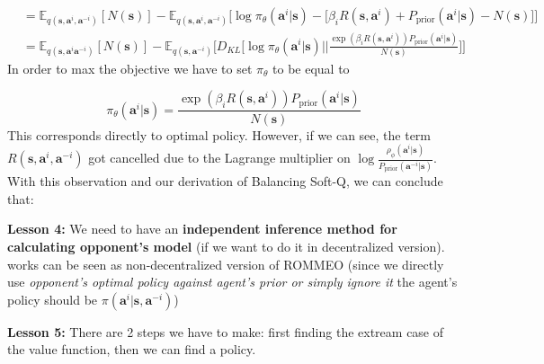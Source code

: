 \begin{equation*}
\begin{aligned}
        &= \mathbb{E}_{q(\boldsymbol{s}, \boldsymbol{a}^i, \boldsymbol{a}^{-i})}[N(\boldsymbol{s})] - 
        \mathbb{E}_{q(\boldsymbol{s}, \boldsymbol{a}^i, \boldsymbol{a}^{-i})}\bigg[\log \pi_{\theta}(\boldsymbol{a}^i | \boldsymbol{s}) - \bigg[\beta_i R(\boldsymbol{s}, \boldsymbol{a}^i) +P_{\text{prior}}(\boldsymbol{a}^i | \boldsymbol{s}) -  N(\boldsymbol{s}) \bigg] \bigg] \\
        &= \mathbb{E}_{q(\boldsymbol{s}, \boldsymbol{a}^i \boldsymbol{a}^{-i})}[N(\boldsymbol{s})] - 
        \mathbb{E}_{q(\boldsymbol{s},  \boldsymbol{a}^{-i})}\bigg[D_{KL}\bigg[ \log \pi_{\theta}(\boldsymbol{a}^i | \boldsymbol{s}) \bigg|\bigg| \frac{\exp\left( \beta_i R(\boldsymbol{s}, \boldsymbol{a}^i)\right) P_{\text{prior}}(\boldsymbol{a}^i | \boldsymbol{s})}{N(\boldsymbol{s})}  \bigg]\bigg]
    \end{aligned} 
\end{equation*}
In order to max the objective we have to set $\pi_{\theta}$ to be equal to 

\begin{equation*}
    \pi_{\theta}(\boldsymbol{a}^i | \boldsymbol{s}) = \frac{\exp\left( \beta_i R(\boldsymbol{s}, \boldsymbol{a}^i)\right) P_{\text{prior}}(\boldsymbol{a}^i | \boldsymbol{s})}{N(\boldsymbol{s})}
\end{equation*}
This corresponds directly to \cite{grau2018balancing} optimal policy. However, if we can see, the term $R(\boldsymbol{s}, \boldsymbol{a}^i, \boldsymbol{a}^{-i})$ got cancelled due to the Lagrange multiplier on $\log \frac{\rho_{\phi}(\boldsymbol{a}^i | \boldsymbol{s})}{P_{\text{prior}}(\boldsymbol{a}^{-i} | \boldsymbol{s})}$. With this observation and our derivation of Balancing Soft-Q, we can conclude that: 

\begin{tcolorbox}
\textbf{Lesson 4: }\label{lesson:4} We need to have an \textbf{independent inference method for calculating opponent's model} (if we want to do it in decentralized version). \cite{grau2018balancing} works can be seen as non-decentralized version of ROMMEO (since we directly use \textit{opponent's optimal policy against agent's prior or simply ignore it} the agent's policy should be $\pi(\boldsymbol{a}^i | \boldsymbol{s}, \boldsymbol{a}^{-i})$)
\end{tcolorbox}

\begin{tcolorbox}
\textbf{Lesson 5: } There are 2 steps we have to make: first finding the extream case of the value function, then we can find a policy.  
\end{tcolorbox}

